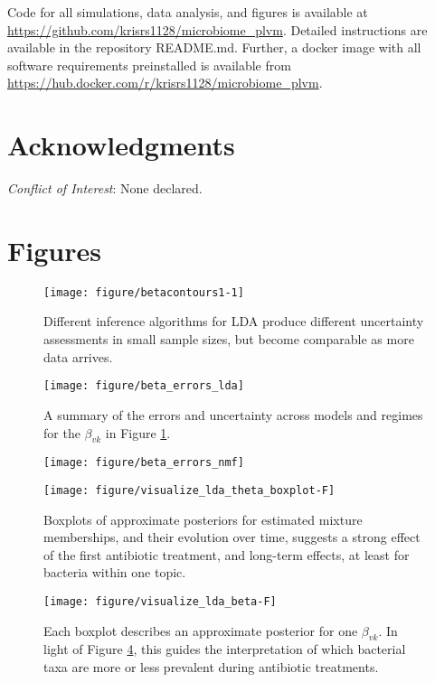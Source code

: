 \documentclass[oupdraft]{bio}
\begin{document}
Code for all simulations, data analysis, and figures is available at
\url{https://github.com/krisrs1128/microbiome_plvm}. Detailed instructions are
available in the repository README.md. Further, a docker image with all software
requirements preinstalled is available from
\url{https://hub.docker.com/r/krisrs1128/microbiome_plvm}.

\section*{Acknowledgments}

{\it Conflict of Interest}: None declared.




\section{Figures}

\begin{figure}[!p]
  \centering\texttt{[image: figure/betacontours1-1]}
  \caption{Different inference algorithms for LDA produce different uncertainty
    assessments in small sample sizes, but become comparable as more data arrives.}
  \label{fig:lda_contours}
\end{figure}

\begin{figure}[!p]
  \centering
  \texttt{[image: figure/beta\_errors\_lda]}
  \caption{A summary of the errors and uncertainty across models and regimes for
    the $\beta_{vk}$ in Figure
    \ref{fig:lda_contours}. \label{fig:beta_errors_lda} }
\end{figure}

\begin{figure}[!p]
  \centering
  \texttt{[image: figure/beta\_errors\_nmf]}
  \caption{\label{fig:zinf_errors_beta} }
\end{figure}

\begin{figure}[!p]
  \centering\texttt{[image: figure/visualize\_lda\_theta\_boxplot-F]}
  \caption{Boxplots of approximate posteriors for estimated mixture memberships,
    and their evolution over time, suggests a strong effect of the first
    antibiotic treatment, and long-term effects, at least for bacteria within
    one topic.}
  \label{fig:antibiotics_lda_theta}
\end{figure}

\begin{figure}[!p]
  \centering\texttt{[image: figure/visualize\_lda\_beta-F]}
  \caption{Each boxplot describes an approximate posterior for one $\beta_{vk}$.
    In light of Figure \ref{fig:antibiotics_lda_theta}, this guides the
    interpretation of which bacterial taxa are more or less prevalent during
    antibiotic treatments.}
  \label{fig:antibiotics_lda_beta}
\end{figure}
\end{document}
